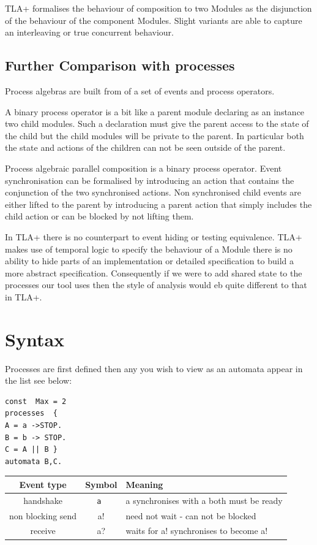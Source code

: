 \documentclass[]{article}
\begin{document}
TLA+ formalises the behaviour of  composition to two Modules as the disjunction of the behaviour of the component Modules. Slight variants are able to capture an interleaving or true concurrent behaviour.

\subsection{Further Comparison with processes}

Process algebras are built from  of a set of events and process operators.


A binary process operator  is a bit like a parent module declaring as an instance two child modules.  Such a declaration must give the parent access to the state of the child but  the child modules will be private to the parent.  In particular both the state and actions of the children can not be seen outside of the parent.

Process algebraic parallel composition  is a binary process operator.
Event synchronisation can be formalised by introducing an action that contains the conjunction of the two synchronised actions. Non synchronised child events are either lifted to the parent  by introducing a parent action that simply includes the child action or can be blocked by not lifting them.



In TLA+ there is no counterpart to event hiding or testing equivalence. TLA+ makes use of temporal logic to specify the behaviour of a Module there is no ability to hide parts of an implementation or  detailed specification  to build a more abstract specification.
Consequently if we were to add shared state to the processes our tool uses then the style of analysis would eb quite different to that in TLA+.


\newpage
\section{Syntax}

\noindent 
 Processes are first defined then any you wish to view as an automata appear in the list  see below:
\begin{minipage}{0.2\textwidth}
\begin{verbatim}
const  Max = 2
processes  {  
A = a ->STOP.
B = b -> STOP.
C = A || B }
automata B,C.
 \end{verbatim}
 \end{minipage}
\begin{minipage}{0.65\textwidth}
\begin{tabular}{|c|c|l|} \hline Event type & Symbol & Meaning\\ \hline
handshake  & {\tt a } & {\sf a} synchronises with {\sf a}   both must be ready\\ \hline
non blocking send   & {\sf a!}  & need not wait - can not be blocked\\ \hline
receive   & {\sf a?}  & waits for {\sf a!} synchronises to become {\sf a!} \\ \hline

\end{tabular}
\end{minipage}
\end{document}
